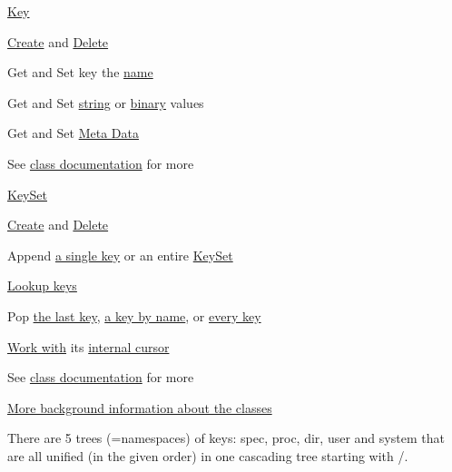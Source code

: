 \hyperlink{group__key}{Key}


\begin{DoxyItemize}
\item \hyperlink{group__key_gad23c65b44bf48d773759e1f9a4d43b89}{Create} and \hyperlink{group__key_ga3df95bbc2494e3e6703ece5639be5bb1}{Delete}
\item Get and Set key the \hyperlink{group__keyname_ga7699091610e7f3f43d2949514a4b35d9}{name}
\item Get and Set \hyperlink{group__keyvalue_ga622bde1eb0e0c4994728331326340ef2}{string} or \hyperlink{group__keyvalue_gaa50a5358fd328d373a45f395fa1b99e7}{binary} values
\item Get and Set \hyperlink{group__keymeta}{Meta Data}
\item See \hyperlink{group__key}{class documentation} for more
\end{DoxyItemize}

\hyperlink{group__keyset}{Key\+Set}


\begin{DoxyItemize}
\item \hyperlink{group__keyset_ga671e1aaee3ae9dc13b4834a4ddbd2c3c}{Create} and \hyperlink{group__keyset_ga27e5c16473b02a422238c8d970db7ac8}{Delete}
\item Append \hyperlink{group__keyset_gaa5a1d467a4d71041edce68ea7748ce45}{a single key} or an entire \hyperlink{group__keyset_ga21eb9c3a14a604ee3a8bdc779232e7b7}{Key\+Set}
\item \hyperlink{group__keyset_ga60f1ddcf23272f2b29b90e92ebe9b56f}{Lookup keys}
\item Pop \hyperlink{group__keyset_gae42530b04defb772059de0600159cf69}{the last key}, \hyperlink{group__keyset_ga60f1ddcf23272f2b29b90e92ebe9b56f}{a key by name}, or \hyperlink{group__keyset_gaba1f1dbea191f4d7e7eb3e4296ae7d5e}{every key}
\item \hyperlink{group__keyset_ga317321c9065b5a4b3e33fe1c399bcec9}{Work with} its \hyperlink{group__keyset_ga4287b9416912c5f2ab9c195cb74fb094}{internal cursor}
\item See \hyperlink{group__keyset}{class documentation} for more
\end{DoxyItemize}

\hyperlink{doc_dev_classes_md}{More background information about the classes}

There are 5 trees (=namespaces) of keys\+: {\ttfamily spec}, {\ttfamily proc}, {\ttfamily dir}, {\ttfamily user} and {\ttfamily system} that are all unified (in the given order) in one cascading tree starting with {\ttfamily /}.


